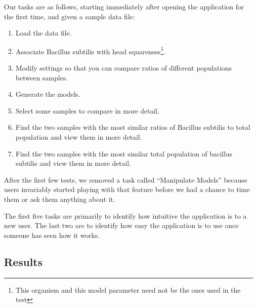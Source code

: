 \documentclass[letterpaper,10pt, onecolumn, draftclsnofoot]{IEEEtran}
\begin{document}
Our tasks are as follows, starting immediately after opening the application for the first time, and given a sample data file:
\begin{enumerate}
	\item Load the data file.
	\item Associate Bacillus subtilis with head squareness\footnote{This organism and this model parameter need not be the ones used in the test}.
	\item Modify settings so that you can compare ratios of different populations between samples.
	\item Generate the models.
	\item Select some samples to compare in more detail.
	\item Find the two samples with the most similar ratios of Bacillus subtilis to total population and view them in more detail.
	\item Find the two samples with the most similar total population of bacillus subtilis and view them in more detail.
\end{enumerate}

After the first few tests, we removed a task called ``Manipulate Models'' because users invariably started playing with that feature before we had a chance to time them or ask them anything about it.

The first five tasks are primarily to identify how intuitive the application is to a new user. The last two are to identify how easy the application is to use once someone has seen how it works.

\subsection{Results}
\end{document}
